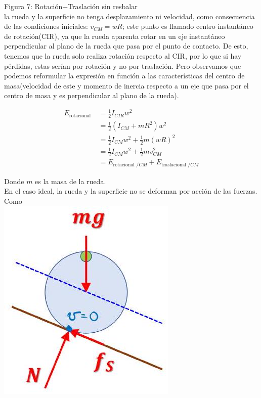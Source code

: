 \documentclass[10pt]{article}
\begin{document}
Figura 7: Rotación+Traslación sin resbalar\\
la rueda y la superficie no tenga desplazamiento ni velocidad, como consecuencia de las condiciones iniciales: $v_{C M}=w R$; este punto es llamado centro instantáneo de rotación(CIR), ya que la rueda aparenta rotar en un eje instantáneo perpendicular al plano de la rueda que pasa por el punto de contacto. De esto, tenemos que la rueda solo realiza rotación respecto al CIR, por lo que si hay pérdidas, estas serían por rotación y no por traslación. Pero observamos que podemos reformular la expresión en función a las características del centro de masa(velocidad de este y momento de inercia respecto a un eje que pasa por el centro de masa y es perpendicular al plano de la rueda).

$$
\begin{aligned}
E_{\text {rotacional }} & =\frac{1}{2} I_{C I R} w^{2} \\
& =\frac{1}{2}\left(I_{C M}+m R^{2}\right) w^{2} \\
& =\frac{1}{2} I_{C M} w^{2}+\frac{1}{2} m(w R)^{2} \\
& =\frac{1}{2} I_{C M} w^{2}+\frac{1}{2} m v_{C M}^{2} \\
& =E_{\text {rotacional } / C M}+E_{\text {traslacional } / C M}
\end{aligned}
$$

Donde $m$ es la masa de la rueda.\\
En el caso ideal, la rueda y la superficie no se deforman por acción de las fuerzas. Como\\
\includegraphics[scale = 0.15, center]{2025_04_01_ea720b93e8ebb5d0c6aeg-08}
\end{document}
